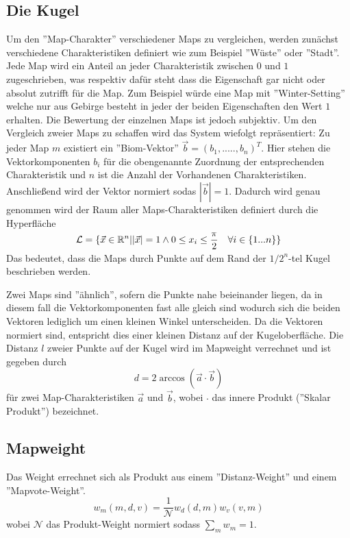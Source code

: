         \subsection{Die Kugel}
    Um den ''Map-Charakter'' verschiedener Maps zu vergleichen, werden zunächst verschiedene Charakteristiken definiert wie zum Beispiel ''Wüste'' oder ''Stadt''.
    Jede Map wird ein Anteil an jeder Charakteristik zwischen $0$ und $1$ zugeschrieben, was respektiv dafür steht dass die Eigenschaft gar nicht oder absolut zutrifft für die Map.
    Zum Beispiel würde eine Map mit ''Winter-Setting'' welche nur aus Gebirge besteht in jeder der beiden Eigenschaften den Wert $1$ erhalten. 
    Die Bewertung der einzelnen Maps ist jedoch subjektiv.
    Um den Vergleich zweier Maps zu schaffen wird das System wiefolgt repräsentiert:
    Zu jeder Map $m$ existiert ein ''Biom-Vektor'' $\vec{b} = (b_1,.....,b_n)^T$. 
    Hier stehen die Vektorkomponenten $b_i$ für die obengenannte Zuordnung der entsprechenden Charakteristik und $n$ ist die Anzahl der Vorhandenen Charakteristiken.
    Anschließend wird der Vektor normiert sodas $|\vec{b}|=1$.
    Dadurch wird genau genommen wird der Raum aller Maps-Charakteristiken definiert durch die Hyperfläche
    \begin{equation*}
        \mathcal{L} = \{\vec{x}\in\mathbb{R}^n ||\vec{x}|=1 \land 0\leq x_i \leq \smash{\frac{\pi}{2}} \quad \forall i\in\{1...n\}\}
    \end{equation*}
    Das bedeutet, dass die Maps durch Punkte auf dem Rand der $1/2^n$-tel Kugel beschrieben werden.

    Zwei Maps sind ''ähnlich'', sofern die Punkte nahe beieinander liegen, da in diesem fall die Vektorkomponenten fast alle gleich sind wodurch sich die beiden Vektoren lediglich um einen kleinen Winkel unterscheiden.
    Da die Vektoren normiert sind, entspricht dies einer kleinen Distanz auf der Kugeloberfläche.
    Die Distanz $l$ zweier Punkte auf der Kugel wird im Mapweight verrechnet und ist gegeben durch 
    \begin{equation}
        d = 2\arccos(\vec{a}\cdot\vec{b})
    \end{equation}
    für zwei Map-Charakteristiken $\vec{a}$ und $\vec{b}$, wobei $\cdot$ das innere Produkt (''Skalar Produkt'') bezeichnet. 
    \subsection{Mapweight}
    Das Weight errechnet sich als Produkt aus einem ''Distanz-Weight'' und einem ''Mapvote-Weight''. 
    \begin{equation}
        w_m(m,d,v) = \frac{1}{\mathcal{N}}w_d(d,m)w_v(v,m)
    \end{equation}
    wobei $\mathcal{N}$ das Produkt-Weight normiert sodass $\sum_m w_m = 1$.
